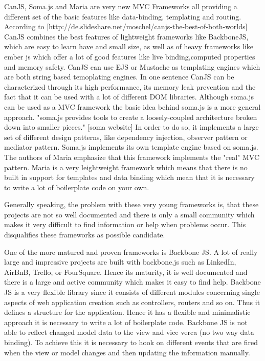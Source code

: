 CanJS, Soma.js and Maria are very new MVC Frameworks all providing a different set of the basic features like data-binding, templating and routing. According to [http://de.slideshare.net/moschel/canjs-the-best-of-both-worlds] CanJS combines the best features of lightweight frameworks like BackboneJS, which are easy to learn have and small size, as well as of heavy frameworks like ember js which offer a lot of good features like live binding,computed properties and memory safety. CanJS can use EJS or Mustache as templating engines which are both string based temoplating engines. In one sentence CanJS can be  characterized through its high performance, its memory leak prevention and the fact that it can be used with a lot of different DOM libraries. Although soma.js can be used as a MVC framework the basic idea behind soma.js is a more general approach. "soma.js  provides tools to create a loosely-coupled architecture broken down into smaller pieces." [soma website] In order to do so, it implements a large set of different design patterns, like dependency injection, observer pattern or mediator pattern. Soma.js implements its own template engine based on soma.js.
The authors of Maria emphasize that this framework implements the "real" MVC pattern. Maria is a very leightweight framework which means that there is no built in support for templates and data binding which mean that it is necessary to write a lot of boilerplate code on your own.


Generally speaking, the problem with these very young frameworks is, that these projects are not so well documented and there is only a small community which makes it very difficult to find information or help when problems occur. This disqualifies these frameworks as possible candidate.


One of the more matured and proven frameworks is Backbone JS. A lot of really large and impressive projects are built with backbone.js such as  LinkedIn, AirBnB, Trello, or FourSquare. Hence its maturity, it is well documented and there is a large and active community which makes it easy to find help. Backbone JS is a very flexible library since it consists of different modules concerning single aspects of web application creation such as controllers, routers and so on. Thus it defines a structure for the application. Hence it has a flexible and minimalistic approach it is necessary to write a lot of boilerplate code. Backbone JS is not able to reflect changed model data to the view and vice verca (no two way data binding). To achieve this it is necessary to hook on different events that are fired when the view or model changes and then updating the information manually. 



